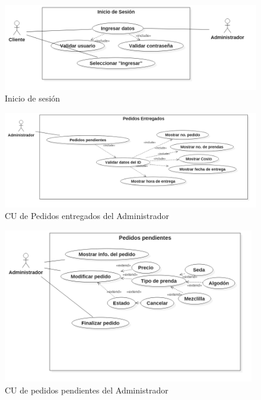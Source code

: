 \begin{figure}[htb]
\begin{center}
\includegraphics[width=19cm]{./imagenes/diagramas/CU_IniciarSesion.png}
\end{center}
\caption{Inicio de sesión}
\end{figure}


\begin{figure}[htb]
\begin{center}
\includegraphics[width=16cm]{./imagenes/diagramas/CU_PedidosEntregados(Admin).png}
\end{center}
\caption{CU de Pedidos entregados del Administrador}
\end{figure}
\newpage

\begin{figure}[htb]
\begin{center}
\includegraphics[width=11cm]{./imagenes/diagramas/CU_PedidosPendientes(Admin).png}
\end{center}
\caption{CU de pedidos pendientes del Administrador}
\end{figure}
\newpage

